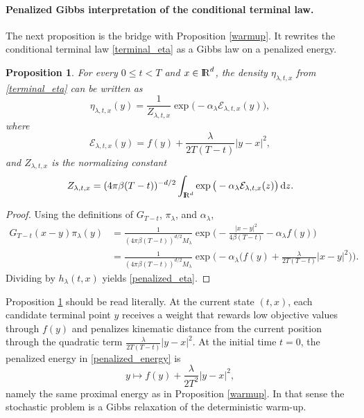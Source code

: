 \documentclass[11pt]{amsart}
\def\R{\mathrm{I\kern-0.21emR}}
\newcommand{\dd}{\,\mathrm{d}}
\renewcommand{\leq}{\leqslant}
\renewcommand{\Vert}{|}
\numberwithin{equation}{section}
\numberwithin{figure}{section}
\newtheorem{proposition}[theorem]{Proposition}%
\theoremstyle{definition}\newtheorem{remark}[theorem]{Remark}%
\begin{document}
\medskip
\paragraph{\bf Penalized Gibbs interpretation of the conditional terminal law.}
The next proposition is the bridge with Proposition \ref{warmup}. It rewrites the conditional terminal law \eqref{terminal_eta} as a Gibbs law on a penalized energy.

\begin{proposition}\label{penalized_gibbs}
For every $0 \leq t < T$ and $x \in \R^d$, the density $\eta_{\lambda,t,x}$ from \eqref{terminal_eta} can be written as
\begin{equation}\label{penalized_eta}
\eta_{\lambda,t,x}(y) = \frac{1}{Z_{\lambda,t,x}} \exp \big( - \alpha_\lambda \mathcal E_{\lambda,t,x}(y) \big),
\end{equation}
where
\begin{equation}\label{penalized_energy}
\mathcal E_{\lambda,t,x}(y) = f(y) + \frac{\lambda}{2T(T-t)}\Vert y - x \Vert^2,
\end{equation}
and $Z_{\lambda,t,x}$ is the normalizing constant
$$
Z_{\lambda,t,x} = (4\pi \beta (T-t))^{-d/2}\int_{\R^d} \exp \big( - \alpha_\lambda \mathcal E_{\lambda,t,x}(z) \big)\dd z.
$$
\end{proposition}

\begin{proof}
Using the definitions of $G_{T-t}$, $\pi_\lambda$, and $\alpha_\lambda$,
\begin{align*}
G_{T-t}(x-y)\pi_\lambda(y)
&= \frac{1}{(4\pi \beta (T-t))^{d/2}M_\lambda} \exp \bigg( - \frac{\Vert x - y \Vert^2}{4\beta(T-t)} - \alpha_\lambda f(y) \bigg) \\
&= \frac{1}{(4\pi \beta (T-t))^{d/2}M_\lambda} \exp \bigg( - \alpha_\lambda \Big( f(y) + \frac{\lambda}{2T(T-t)}\Vert x - y \Vert^2 \Big) \bigg).
\end{align*}
Dividing by $h_\lambda(t,x)$ yields \eqref{penalized_eta}.
\end{proof}

Proposition \ref{penalized_gibbs} should be read literally. At the current state $(t,x)$, each candidate terminal point $y$ receives a weight that rewards low objective values through $f(y)$ and penalizes kinematic distance from the current position through the quadratic term $\displaystyle \frac{\lambda}{2T(T-t)}\Vert y - x \Vert^2$. At the initial time $t = 0$, the penalized energy in \eqref{penalized_energy} is 
$$
y \mapsto f(y) + \frac{\lambda}{2T^2}\Vert y - x \Vert^2,
$$
namely the same proximal energy as in Proposition \ref{warmup}. In that sense the stochastic problem is a Gibbs relaxation of the deterministic warm-up.
\end{document}
